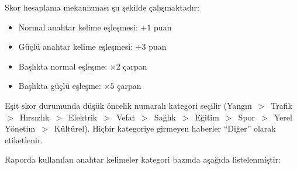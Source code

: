\documentclass[conference]{IEEEtran}
\begin{document}
Skor hesaplama mekanizması şu şekilde çalışmaktadır:
\begin{itemize}
    \item Normal anahtar kelime eşleşmesi: $+1$ puan
    \item Güçlü anahtar kelime eşleşmesi: $+3$ puan
    \item Başlıkta normal eşleşme: $\times 2$ çarpan
    \item Başlıkta güçlü eşleşme: $\times 5$ çarpan
\end{itemize}

Eşit skor durumunda düşük öncelik numaralı kategori seçilir (Yangın~$>$~Trafik~$>$~Hırsızlık~$>$~Elektrik~$>$~Vefat~$>$~Sağlık~$>$~Eğitim~$>$~Spor~$>$~Yerel Yönetim~$>$~Kültürel). Hiçbir kategoriye girmeyen haberler ``Diğer'' olarak etiketlenir.

Raporda kullanılan anahtar kelimeler kategori bazında aşağıda listelenmiştir:
\end{document}
